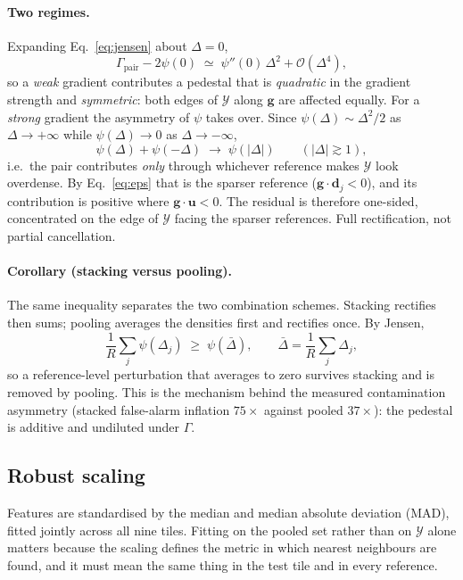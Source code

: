 \documentclass[11pt,a4paper]{article}
\newcommand{\vb}[1]{\bm{#1}}                 %
\newcommand{\gvec}{\vb{g}}                   %
\newcommand{\dvec}{\vb{d}}                   %
\newcommand{\uvec}{\vb{u}}                   %
\newcommand{\Ycal}{\mathcal{Y}}              %
\newcommand{\Ups}{\Upsilon}                  %
\newcommand{\Gam}{\Gamma}                    %
\newcommand{\Ocal}{\mathcal{O}}              %
\newcommand{\Ups}{\Upsilon}
\newcommand{\Gam}{\Gamma}
\newcommand{\Ycal}{\mathcal{Y}}
\newcommand{\dvec}{\vec{d}}
\begin{document}
\paragraph{Two regimes.}
Expanding Eq.~\eqref{eq:jensen} about $\Delta=0$,
%
\begin{equation}
\Gam_{\mathrm{pair}}-2\psi(0)\;\simeq\;\psi''(0)\,\Delta^2+\Ocal(\Delta^4),
\label{eq:weak}
\end{equation}
%
so a \emph{weak} gradient contributes a pedestal that is \emph{quadratic} in the
gradient strength and \emph{symmetric}: both edges of $\Ycal$ along $\gvec$ are
affected equally. For a \emph{strong} gradient the asymmetry of $\psi$ takes over.
Since $\psi(\Delta)\sim\Delta^2/2$ as $\Delta\to+\infty$ while $\psi(\Delta)\to0$ as
$\Delta\to-\infty$,
%
\begin{equation}
\psi(\Delta)+\psi(-\Delta)\;\longrightarrow\;\psi(|\Delta|)
\qquad (|\Delta|\gtrsim1),
\end{equation}
%
i.e.\ the pair contributes \emph{only} through whichever reference makes $\Ycal$ look
overdense. By Eq.~\eqref{eq:eps} that is the sparser reference
($\gvec\cdot\dvec_j<0$), and its contribution is positive where
$\gvec\cdot\uvec<0$. The residual is therefore one-sided, concentrated on the edge of
$\Ycal$ facing the sparser references. Full rectification, not partial cancellation.

\paragraph{Corollary (stacking versus pooling).}
The same inequality separates the two combination schemes. Stacking rectifies then
sums; pooling averages the densities first and rectifies once. By Jensen,
%
\begin{equation}
\frac{1}{R}\sum_{j}\psi(\Delta_j)\;\ge\;\psi\!\left(\bar\Delta\right),
\qquad \bar\Delta=\frac1R\sum_j\Delta_j ,
\end{equation}
%
so a reference-level perturbation that averages to zero survives stacking and is
removed by pooling. This is the mechanism behind the measured contamination
asymmetry (stacked false-alarm inflation $75\times$ against pooled $37\times$): the
pedestal is additive and undiluted under $\Gam$.


\subsection{Robust scaling}
\label{sec:scaling}

Features are standardised by the median and median absolute deviation (MAD), fitted jointly across
all nine tiles. Fitting on the pooled set rather than on $\Ycal$ alone matters because the scaling
defines the metric in which nearest neighbours are found, and it must mean the same thing in the
test tile and in every reference.
\end{document}
